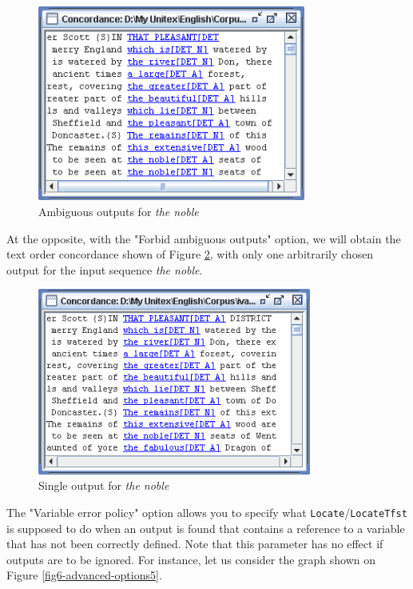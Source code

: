 \bigskip
\begin{figure}[!h]
\begin{center}
\includegraphics[width=8.8cm]{resources/img/fig6-advanced-options3.png}
\caption{Ambiguous outputs for \textit{the noble}\label{fig6-advanced-options3}}
\end{center}
\end{figure}


\noindent At the opposite, with the "Forbid ambiguous
outputs" option, we will obtain the text order
concordance shown of Figure \ref{fig6-advanced-options4}, with only one
arbitrarily chosen output for the input sequence \textit{the noble}.

\bigskip
\begin{figure}[!h]
\begin{center}
\includegraphics[width=9cm]{resources/img/fig6-advanced-options4.png}
\caption{Single output for \textit{the noble}\label{fig6-advanced-options4}}
\end{center}
\end{figure}


\bigskip
\noindent The "Variable error policy" option allows you to specify what
\verb+Locate+/\verb+LocateTfst+ is supposed to do when an output is found that
contains a reference to a variable that has not been correctly defined. Note
that this parameter has no effect if outputs are to be ignored. 
For instance, let us consider the graph shown on Figure
\ref{fig6-advanced-options5}. 

